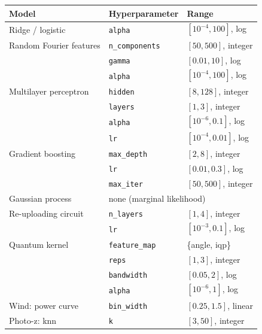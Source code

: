 \begin{tabular}{@{}lll@{}}
\toprule
Model & Hyperparameter & Range \\
\midrule
Ridge / logistic & \texttt{alpha} & $[10^{-4}, 100]$, log \\
Random Fourier features & \texttt{n\_components} & $[50, 500]$, integer \\
 & \texttt{gamma} & $[0.01, 10]$, log \\
 & \texttt{alpha} & $[10^{-4}, 100]$, log \\
Multilayer perceptron & \texttt{hidden} & $[8, 128]$, integer \\
 & \texttt{layers} & $[1, 3]$, integer \\
 & \texttt{alpha} & $[10^{-6}, 0.1]$, log \\
 & \texttt{lr} & $[10^{-4}, 0.01]$, log \\
Gradient boosting & \texttt{max\_depth} & $[2, 8]$, integer \\
 & \texttt{lr} & $[0.01, 0.3]$, log \\
 & \texttt{max\_iter} & $[50, 500]$, integer \\
Gaussian process & \multicolumn{2}{l}{none (marginal likelihood)} \\
Re-uploading circuit & \texttt{n\_layers} & $[1, 4]$, integer \\
 & \texttt{lr} & $[10^{-3}, 0.1]$, log \\
Quantum kernel & \texttt{feature\_map} & \{angle, iqp\} \\
 & \texttt{reps} & $[1, 3]$, integer \\
 & \texttt{bandwidth} & $[0.05, 2]$, log \\
 & \texttt{alpha} & $[10^{-6}, 1]$, log \\
Wind: power curve & \texttt{bin\_width} & $[0.25, 1.5]$, linear \\
Photo-z: knn & \texttt{k} & $[3, 50]$, integer \\
\bottomrule
\end{tabular}
